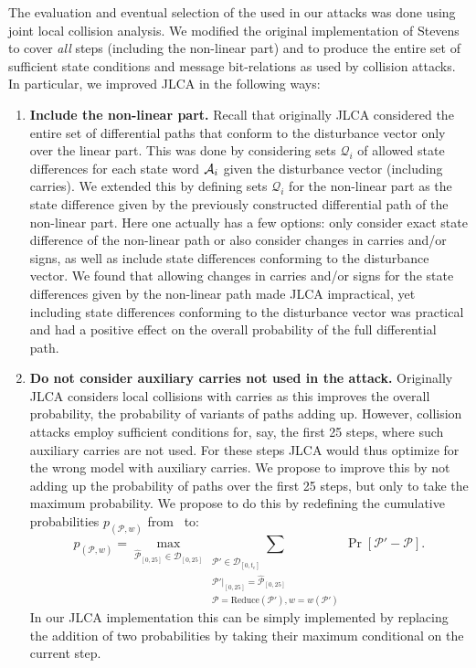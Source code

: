 The evaluation and eventual selection of the \dvs used in our attacks was done using joint local collision analysis. We modified the original implementation of Stevens~\cite{DBLP:conf/eurocrypt/Stevens13}
to cover \emph{all} steps (including the non-linear part) and to produce the entire set of sufficient state conditions and message bit-relations as used by collision attacks.
In particular, we improved JLCA in the following ways:
\begin{enumerate}
\item \textbf{Include the non-linear part.} Recall that originally JLCA considered the entire set of differential paths that conform to the disturbance vector only
over the linear part. 
This was done by considering sets $\mathcal{Q}_i$ of allowed state differences for each state word $\mathcal{A}_i$ given the disturbance vector (including carries).
We extended this by defining sets $\mathcal{Q}_i$ for the non-linear part as the state difference given by the previously constructed differential path of the non-linear part.
Here one actually has a few options: only consider exact state difference of the non-linear path or also consider changes in carries and/or signs, as well as include state differences conforming to the disturbance vector.
We found that allowing changes in carries and/or signs for the state differences given by the non-linear path made JLCA impractical,
yet including state differences conforming to the disturbance vector was practical and had a positive effect on the overall probability of the full differential path.

\item \textbf{Do not consider auxiliary carries not used in the attack.} Originally JLCA considers local collisions with carries as this improves the overall probability, the probability of variants of paths adding up. 
However, collision attacks employ sufficient conditions for, say, the first 25 steps, where such auxiliary carries are not used. For these steps JLCA would thus optimize for the wrong model with auxiliary carries. 
We propose to improve this by not adding up the probability of paths over the first 25 steps, but only to take the maximum probability. 
We propose to do this by redefining the cumulative probabilities $p_{(\mathcal{P},w)}$ from~\cite[Sec 4.6]{DBLP:conf/eurocrypt/Stevens13} to:
\[ p_{(\mathcal{P},w)} = \max_{\widehat{\mathcal{P}}_{[0,25]}\in\mathcal{D}_{[0,25]}} 
  \sum_{\substack{
	    \mathcal{P}'\in\mathcal{D}_[0,t_e]\\
			\mathcal{P}'|_{[0,25]}=\widehat{\mathcal{P}}_{[0,25]}\\
			\mathcal{P}=\mathrm{Reduce}(\mathcal{P}'), w=w(\mathcal{P}')
			}} 
	 \Pr[\mathcal{P}'-\mathcal{P}]. 
\]
In our JLCA implementation this can be simply implemented by replacing the addition of two probabilities by taking their maximum conditional on the current \shaone step.


\end{enumerate}
